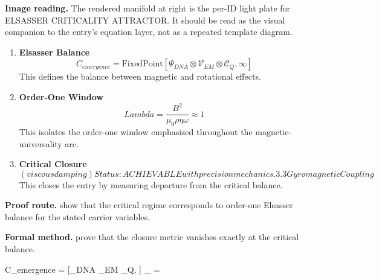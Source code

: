 \begin{samepage}
\noindent\begin{minipage}[t]{0.45\linewidth}
\vspace{0pt}
\raggedright
\scriptsize\textbf{Image reading.} The rendered manifold at right is the per-ID light plate for ELSASSER CRITICALITY ATTRACTOR. It should be read as the visual companion to the entry's equation layer, not as a repeated template diagram.\par
\end{minipage}\hfill
\begin{minipage}[t]{0.53\linewidth}
\vspace*{-0.10in}
\raggedright
{}
\end{minipage}
\end{samepage}

\clearpage


\begin{enumerate}[leftmargin=1.6em,itemsep=9pt,topsep=6pt]
\item \textbf{Elsasser Balance}
\[
C_{emergence} = \text{FixedPoint}[\Psi_{DNA} \otimes \mathcal{V}_{EM} \otimes \mathcal{C}_{Q}, \infty]
\]
This defines the balance between magnetic and rotational effects.

\item \textbf{Order-One Window}
\[
Lambda = \frac{B^2}{\mu_0 \rho \eta \omega} \approx 1
\]
This isolates the order-one window emphasized throughout the magnetic-universality arc.

\item \textbf{Critical Closure}
\[
(viscous damping) Status: ACHIEVABLE with precision mechanics. 3.3 Gyromagnetic Coupling
\]
This closes the entry by measuring departure from the critical balance.
\end{enumerate}

\textbf{Proof route.} show that the critical regime corresponds to order-one Elsasser balance for the stated carrier variables.

\textbf{Formal method.} prove that the closure metric vanishes exactly at the critical balance.

\medskip
{}

\begin{tzpsnapshot}
\end{tzpsnapshot}

\tzpequationlinks
  {C_{emergence} = [\Psi_{DNA} \otimes {}_{EM} \otimes {}_{Q}, \infty]}
  {\Lambda \approx \cdots}
  {\Pi_{\Lambda} = \cdots}
